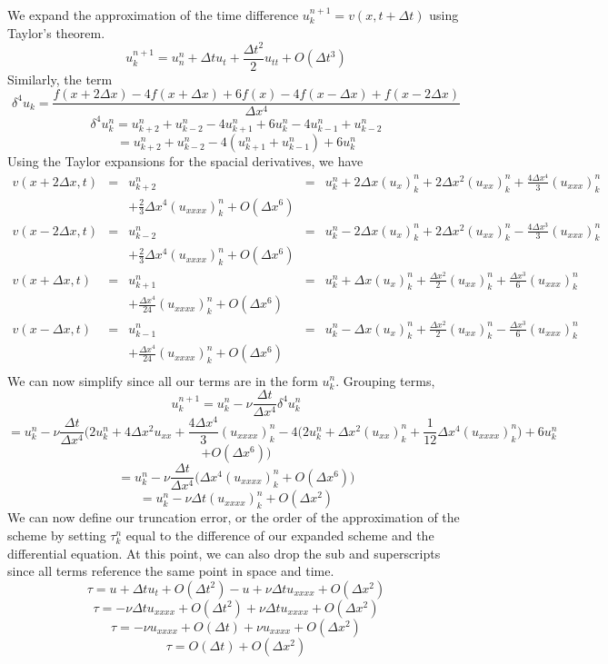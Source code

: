 \documentclass[12pt]{article}
\theoremstyle{definition}
\begin{document}
\begin{enumerate}
\begin{enumerate}[(i)]
We expand the approximation of the time difference $u_k^{n+1}=v(x,t+\Delta t)$ using Taylor's theorem.
\[u_k^{n+1}=u_n^n+\Delta t u_t+\frac{\Delta t^2}{2}u_{tt} +O(\Delta t^3)\]
Similarly, the term 
\[\delta^4u_k=\frac{f(x+2\Delta x)-4f(x+\Delta x)+6f(x)-4f(x-\Delta x)+f(x-2\Delta x)}{\Delta x^4}\]
\[\delta^4u_k^n=u_{k+2}^n +u_{k-2}^n -4u_{k+1}^n+6u_k^n-4u_{k-1}^n+u_{k-2}^n\]
\[=u_{k+2}^n+u_{k-2}^n-4(u_{k+1}^n+u_{k-1}^n)+6u_k^n\]
Using the Taylor expansions for the spacial derivatives, we have\\
$\begin{array}{rclllll}
v(x+2\Delta x,t)&=& u_{k+2}^n&=&u_k^n+2\Delta x(u_x)_k^n+2\Delta x^2(u_{xx})_k^n +\frac{4\Delta x^4}{3}(u_{xxx})_k^n\\
&&+\frac{2}{3}\Delta x^4(u_{xxxx})_k^n +O(\Delta x^6)&&\\
v(x-2\Delta x,t)&=& u_{k-2}^n&=&u_k^n-2\Delta x(u_x)_k^n+2\Delta x^2(u_{xx})_k^n -\frac{4\Delta x^3}{3}(u_{xxx})_k^n\\
&&+\frac{2}{3}\Delta x^4(u_{xxxx})_k^n +O(\Delta x^6)&&\\
v(x+\Delta x,t)&=&u_{k+1}^n&=&u_k^n+\Delta x (u_{x})_k^n +\frac{\Delta x^2}{2}(u_{xx})_k^n+\frac{\Delta x^3}{6}(u_{xxx})_k^n \\
&&+ \frac{\Delta x^4}{24}(u_{xxxx})_k^n+ O(\Delta x^6)\\
v(x-\Delta x,t)&=&u_{k-1}^n&=&u_k^n-\Delta x (u_{x})_k^n +\frac{\Delta x^2}{2}(u_{xx})_k^n-\frac{\Delta x^3}{6}(u_{xxx})_k^n\\
&&+ \frac{\Delta x^4}{24}(u_{xxxx})_k^n+ O(\Delta x^6)\\
\end{array}$
We can now simplify since all our terms are in the form $u_k^n$. Grouping terms,
\[u_k^{n+1}=u_k^n -\nu\frac{\Delta t}{\Delta x^4}\delta^4u_k^n\]
\[=u_k^n-\nu\frac{\Delta t}{\Delta x^4}\big (2u_k^n+4\Delta x^2u_{xx}+\frac{4\Delta x^4}{3}(u_{xxxx})_k^n-4\big (2u_k^n+\Delta x^2(u_{xx})_k^n +\frac{1}{12}\Delta x^4(u_{xxxx})_k^n)+6u_k^n\]\[ +O(\Delta x^6)\big )\]
\[=u_k^n-\nu\frac{\Delta t}{\Delta x^4}\big (\Delta x^4(u_{xxxx})_k^n +O(\Delta x^6)\big )\]
\[=u_k^n-\nu\Delta t(u_{xxxx})_k^n +O(\Delta x^2)\]
We can now define our truncation error, or the order of the approximation of the scheme by setting $\tau_k^n$ equal to the difference of our expanded scheme and the differential equation. At this point, we can also drop the sub and superscripts since all terms reference the same point in space and time.
\[\tau=u+\Delta tu_t +O(\Delta t^2) -u+\nu\Delta t u_{xxxx} +O(\Delta x^2)\]
\[\tau=-\nu\Delta tu_{xxxx} +O(\Delta t^2)+\nu\Delta t u_{xxxx} +O(\Delta x^2) \]
\[\tau=-\nu u_{xxxx} +O(\Delta t)+\nu u_{xxxx} +O(\Delta x^2)\]
\[\tau= O(\Delta t) +O(\Delta x^2)\]


\end{enumerate}
\end{enumerate}
\end{document}
